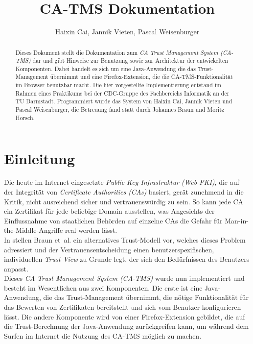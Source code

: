 \documentclass[accentcolor=tud1c,article,colorback,11pt]{tudreport}
\title{CA-TMS Dokumentation}
\subtitle{Haixin Cai, Jannik Vieten, Pascal Weisenburger}
\begin{document}
\maketitle

\begin{abstract}
Dieses Dokument stellt die Dokumentation zum \textit{CA Trust Management System (CA-TMS)} dar und gibt Hinweise zur Benutzung sowie zur Architektur der entwickelten Komponenten. Dabei handelt es sich um eine Java-Anwendung die das Trust-Management übernimmt und eine Firefox-Extension, die die CA-TMS-Funktionalität im Browser benutzbar macht. Die hier vorgestellte Implementierung entstand im Rahmen eines Praktikums bei der CDC-Gruppe des Fachbereichs Informatik an der TU Darmstadt. Programmiert wurde das System von Haixin Cai, Jannik Vieten und Pascal Weisenburger, die Betreuung fand statt durch Johannes Braun und Moritz Horsch.
\end{abstract}
\newpage

\tableofcontents
\newpage

\section{Einleitung}

Die heute im Internet eingesetzte \textit{Public-Key-Infrastruktur (Web-PKI)}, die auf der Integrität von \textit{Certificate Authorities (CAs)} basiert, gerät zunehmend in die Kritik, nicht ausreichend sicher und vertrauenswürdig zu sein. So kann jede CA ein Zertifikat für jede beliebige Domain ausstellen, was Angesichts der Einflussnahme von staatlichen Behörden auf einzelne CAs die Gefahr für Man-in-the-Middle-Angriffe real werden lässt.\\
In \cite{braun2013trust} stellen Braun et~al. ein alternatives Trust-Modell vor, welches dieses Problem adressiert und der Vertrauensentscheidung einen benutzerspezifischen, individuellen \textit{Trust View} zu Grunde legt, der sich den Bedürfnissen des Benutzers anpasst.\\
Dieses \textit{CA Trust Management System (CA-TMS)} wurde nun implementiert und besteht im Wesentlichen aus zwei Komponenten. Die erste ist eine Java-Anwendung, die das Trust-Management übernimmt, die nötige Funktionalität für das Bewerten von Zertifikaten bereitstellt und sich vom Benutzer konfigurieren lässt. Die andere Komponente wird von einer Firefox-Extension gebildet, die auf die Trust-Berechnung der Java-Anwendung zurückgreifen kann, um während dem Surfen im Internet die Nutzung des CA-TMS möglich zu machen.
\end{document}
